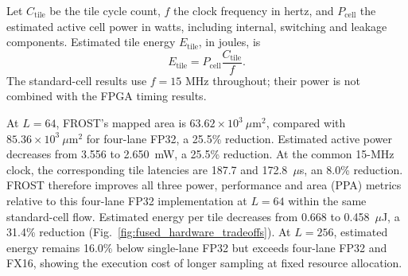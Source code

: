 Let $C_{\mathrm{tile}}$ be the tile cycle count, $f$ the clock frequency
in hertz, and $P_{\mathrm{cell}}$ the estimated active cell power in watts,
including internal, switching and leakage components. Estimated tile
energy $E_{\mathrm{tile}}$, in joules, is
\begin{equation}
E_{\mathrm{tile}}=P_{\mathrm{cell}}\frac{C_{\mathrm{tile}}}{f}.
\label{eq:fused_tile_energy}
\end{equation}
The standard-cell results use $f=15$ MHz throughout; their power is
not combined with the FPGA timing results.

At $L=64$, FROST's mapped area is
$63.62\times10^3~\mu\mathrm{m}^2$, compared with
$85.36\times10^3~\mu\mathrm{m}^2$ for four-lane FP32, a 25.5\%
reduction. Estimated active power decreases from 3.556 to 2.650~mW,
a 25.5\% reduction. At the common 15-MHz clock, the corresponding
tile latencies are 187.7 and 172.8~$\mu$s, an 8.0\% reduction.
FROST therefore improves all three power, performance and area (PPA)
metrics relative to this four-lane FP32 implementation at $L=64$
within the same standard-cell flow. Estimated energy per tile decreases
from 0.668 to 0.458~$\mu$J, a 31.4\% reduction
(Fig.~\ref{fig:fused_hardware_tradeoffs}).
At $L=256$, estimated energy remains 16.0\% below single-lane FP32
but exceeds four-lane FP32 and FX16, showing the execution cost of
longer sampling at fixed resource allocation.

